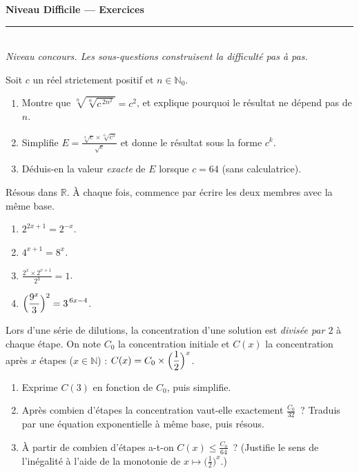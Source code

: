 \documentclass[11pt,a4paper]{article}
\newcommand{\R}{\mathbb{R}}
\newcommand{\N}{\mathbb{N}}
\newcommand{\ds}{\displaystyle}
\begin{document}
\begin{center}
{\LARGE\bfseries\color{primarydark} Niveau Difficile — Exercices}\\[2pt]
{\color{primary}\rule{0.45\textwidth}{1.2pt}}\\[3pt]
{\small\itshape Niveau concours. Les sous-questions construisent la difficulté pas à pas.}
\end{center}
\vspace{1mm}

\begin{exo}
Soit $c$ un réel strictement positif et $n\in\N_0$.
\begin{enumerate}[label=\textbf{\alph*)},leftmargin=2.2em,topsep=1pt,itemsep=2pt]
  \item Montre que $\ds\sqrt[n]{\sqrt[n]{c^{\,2n^{2}}}}=c^{2}$, et explique pourquoi le résultat ne dépend pas de $n$.
  \item Simplifie $\ds E=\frac{\sqrt[3]{c}\times\sqrt[6]{c^{5}}}{\sqrt{c}}$ et donne le résultat sous la forme $c^{k}$.
  \item Déduis-en la valeur \emph{exacte} de $E$ lorsque $c=64$ (sans calculatrice).
\end{enumerate}
\end{exo}

\begin{exo}
Résous dans $\R$. À chaque fois, commence par écrire les deux membres avec la même base.
\begin{enumerate}[label=\textbf{\alph*)},leftmargin=2.2em,topsep=1pt,itemsep=2pt]
  \item $2^{2x+1}=2^{-x}$.
  \item $4^{x+1}=8^{x}$.
  \item $\ds\frac{2^{x}\times 2^{x+1}}{2^{3}}=1$.
  \item $\ds\Bigl(\frac{9^{x}}{3}\Bigr)^{2}=3^{\,6x-4}$.
\end{enumerate}
\end{exo}

\begin{exo}
Lors d'une série de dilutions, la concentration d'une solution est \emph{divisée par $2$} à chaque
étape. On note $C_0$ la concentration initiale et $C(x)$ la concentration après $x$ étapes
($x\in\N$) : $\ds C(x)=C_0\times\Bigl(\frac12\Bigr)^{x}$.
\begin{enumerate}[label=\textbf{\alph*)},leftmargin=2.2em,topsep=1pt,itemsep=2pt]
  \item Exprime $C(3)$ en fonction de $C_0$, puis simplifie.
  \item Après combien d'étapes la concentration vaut-elle exactement $\ds\frac{C_0}{32}$~? Traduis par une équation exponentielle à même base, puis résous.
  \item À partir de combien d'étapes a-t-on $\ds C(x)\leq\frac{C_0}{64}$~? (Justifie le sens de l'inégalité à l'aide de la monotonie de $x\mapsto\bigl(\tfrac12\bigr)^{x}$.)
\end{enumerate}
\end{exo}
\end{document}
